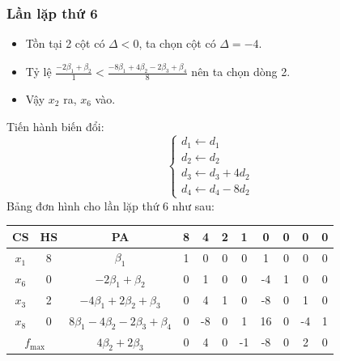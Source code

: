 \documentclass[12pt]{article}
\begin{document}
\subsubsection{Lần lặp thứ 6}
\begin{itemize}
\item Tồn tại 2 cột có $\Delta < 0$, ta chọn cột có $\Delta = -4$.
\item Tỷ lệ $\displaystyle \frac{-2\beta_1 + \beta_2}{1} < \frac{-8\beta_1 + 4\beta_2 - 2\beta_3 + \beta_4}{8}$ nên ta chọn dòng 2.
\item Vậy $x_2$ ra, $x_6$ vào.
\end{itemize}
Tiến hành biến đổi:
$$
\left\{
\begin{array}{lll}
d_1 \leftarrow d_1 \\
d_2 \leftarrow d_2 \\
d_3 \leftarrow d_3 + 4d_2\\
d_4 \leftarrow d_4 - 8d_2
\end{array}
\right.
$$
Bảng đơn hình cho lần lặp thứ 6 như sau:
\begin{table}[H]
\centering
\begin{tabular}{|c|c|c|c|c|c|c|c|c|c|c|}
\hline
CS & HS & PA & 8 & 4 & 2 & 1 & 0 & 0 & 0 & 0 \\
\hline
$x_1$ & 8 & $\beta_1$ & 1 & 0 & 0 & 0 & 1 & 0 & 0 & 0 \\
$x_6$ & 0 & $-2\beta_1 + \beta_2$ & 0 & 1 & 0 & 0 & -4 & 1 & 0 & 0 \\
$x_3$ & 2 & $-4\beta_1 + 2\beta_2 + \beta_3$ & 0 & 4 & 1 & 0 & -8 & 0 & 1 & 0 \\
$x_8$ & 0 & $8\beta_1 - 4\beta_2 - 2\beta_3 + \beta_4$ & 0 & -8 & 0 & 1 & 16 & 0 & -4 & 1 \\
\hline
\multicolumn{2}{|c|}{$f_{\max}$}
& $4\beta_2 + 2\beta_3$ & 0 & 4 & 0 & -1 & -8 & 0 & 2 & 0 \\
\hline
\end{tabular}
\end{table}
\end{document}
